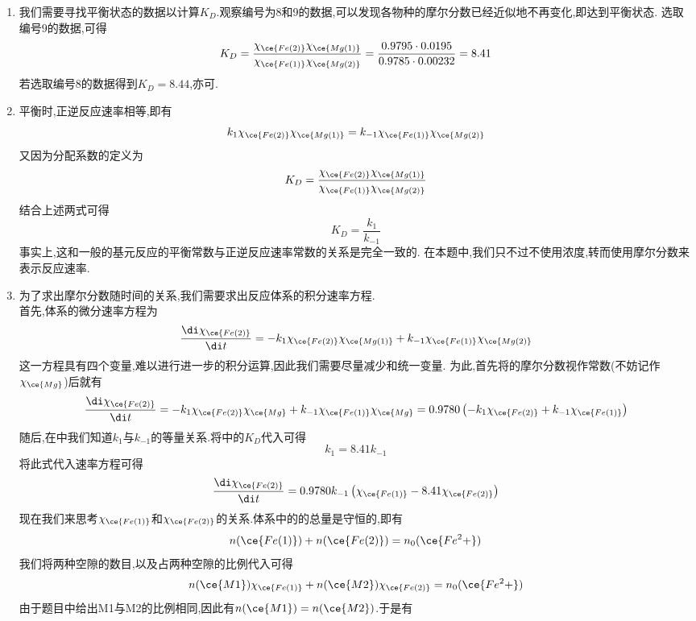 \documentclass{ctexart}
\begin{document}
\begin{solution}
    \begin{enumerate}[label=\tbf{\arabic{Pcounter}-\arabic*},topsep=0pt,parsep=0pt,itemsep=0pt,partopsep=0pt]
        \item 我们需要寻找平衡状态的数据以计算$K_D$.观察编号为8和9的数据,可以发现各物种的摩尔分数已经近似地不再变化,即达到平衡状态.%
            选取编号$9$的数据,可得
            \[K_D=\dfrac{\chi_{\ce{Fe(2)}}\chi_{\ce{Mg(1)}}}{\chi_{\ce{Fe(1)}}\chi_{\ce{Mg(2)}}}
            =\dfrac{0.9795\cdot0.0195}{0.9785\cdot0.00232}=8.41\]
            若选取编号$8$的数据得到$K_D=8.44$,亦可.
        \item 平衡时,正逆反应速率相等,即有
            \[k_1\chi_{\ce{Fe(2)}}\chi_{\ce{Mg(1)}}=k_{-1}\chi_{\ce{Fe(1)}}\chi_{\ce{Mg(2)}}\]
            又因为分配系数的定义为
            \[K_D=\dfrac{\chi_{\ce{Fe(2)}}\chi_{\ce{Mg(1)}}}{\chi_{\ce{Fe(1)}}\chi_{\ce{Mg(2)}}}\]
            结合上述两式可得
            \[K_D=\dfrac{k_1}{k_{-1}}\]
            事实上,这和一般的基元反应的平衡常数与正逆反应速率常数的关系是完全一致的.%
            在本题中,我们只不过不使用浓度,转而使用摩尔分数来表示反应速率.
        \item 为了求出摩尔分数随时间的关系,我们需要求出反应体系的积分速率方程.\\
            首先,体系的微分速率方程为
            \[\dfrac{\di\chi_{\ce{Fe(2)}}}{\di t}=-k_1\chi_{\ce{Fe(2)}}\chi_{\ce{Mg(1)}}+k_{-1}\chi_{\ce{Fe(1)}}\chi_{\ce{Mg(2)}}\]
            这一方程具有四个变量,难以进行进一步的积分运算,因此我们需要尽量减少和统一变量.%
            为此,首先将的摩尔分数视作常数(不妨记作$\chi_{\ce{Mg}}$)后就有
            \[\dfrac{\di\chi_{\ce{Fe(2)}}}{\di t}=-k_1\chi_{\ce{Fe(2)}}\chi_{\ce{Mg}}+k_{-1}\chi_{\ce{Fe(1)}}\chi_{\ce{Mg}}
            =0.9780\left(-k_1\chi_{\ce{Fe(2)}}+k_{-1}\chi_{\ce{Fe(1)}}\right)\]
            随后,在中我们知道$k_1$与$k_{-1}$的等量关系.将中的$K_D$代入可得
            \[k_1=8.41 k_{-1}\]
            将此式代入速率方程可得
            \[\dfrac{\di\chi_{\ce{Fe(2)}}}{\di t}=0.9780k_{-1}\left(\chi_{\ce{Fe(1)}}-8.41\chi_{\ce{Fe(2)}}\right)\]
            现在我们来思考$\chi_{\ce{Fe(1)}}$和$\chi_{\ce{Fe(2)}}$的关系.体系中的的总量是守恒的,即有
            \[n(\ce{Fe(1)})+n(\ce{Fe(2)})=n_0(\ce{Fe^2+})\]
            我们将两种空隙的数目,以及占两种空隙的比例代入可得
            \[n(\ce{{M1}})\chi_{\ce{Fe(1)}}+n(\ce{{M2}})\chi_{\ce{Fe(2)}}=n_0(\ce{Fe^2+})\]
            由于题目中给出M1与M2的比例相同,因此有$n(\ce{{M1}})=n(\ce{{M2}})$.于是有

\end{enumerate}
\end{solution}
\end{document}
